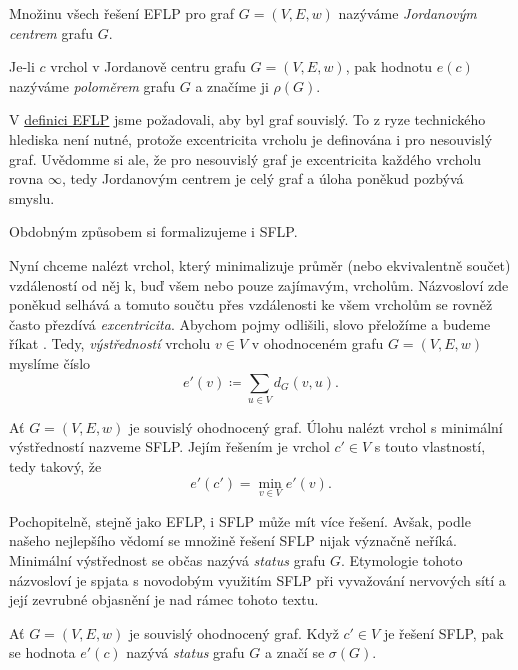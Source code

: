 \begin{definition}
\label{def:jordanovo-centrum}
 Množinu všech řešení EFLP pro graf $G = (V,E,w)$ nazýváme \emph{Jordanovým
 centrem} grafu $G$.
\end{definition}

\begin{definition}
\label{def:polomer-grafu}
 Je-li $c$ vrchol v Jordanově centru grafu $G = (V,E,w)$, pak hodnotu $e(c)$
 nazýváme \emph{poloměrem} grafu $G$ a značíme ji $\rho(G)$.
\end{definition}

\begin{remark}
 V \hyperref[def:eflp]{definici EFLP} jsme požadovali, aby byl graf souvislý.
 To z ryze technického hlediska není nutné, protože excentricita vrcholu je
 definována i pro nesouvislý graf. Uvědomme si ale, že pro nesouvislý graf je
 excentricita každého vrcholu rovna $\infty$, tedy Jordanovým centrem je celý
 graf a úloha poněkud pozbývá smyslu.
\end{remark}

Obdobným způsobem si formalizujeme i SFLP.

Nyní chceme nalézt vrchol, který minimalizuje průměr (nebo ekvivalent\-ně
součet) vzdáleností od něj k, buď všem nebo pouze zajímavým, vrcholům.
Názvosloví zde poněkud selhává a tomuto součtu přes vzdálenosti ke všem vrcholům
se rovněž často přezdívá \emph{excentricita}. Abychom pojmy odlišili, slovo
 přeložíme a budeme říkat . Tedy,
\emph{výstředností} vrcholu $v \in V$ v ohodnoceném grafu $G = (V,E,w)$ myslíme
číslo
\[
 e'(v) \coloneqq \sum_{u \in V} d_G(v,u).
\]

\begin{definition}
 \label{def:sflp}
 Ať $G = (V,E,w)$ je souvislý ohodnocený graf. Úlohu nalézt vrchol s minimální
 výstředností nazveme SFLP. Jejím řešením je vrchol $c' \in V$ s touto
 vlastností, tedy takový, že
 \[
  e'(c') = \min_{v \in V} e'(v).
 \]
\end{definition}

Pochopitelně, stejně jako EFLP, i SFLP může mít více řešení. Avšak, podle našeho
nejlepšího vědomí se množině řešení SFLP nijak význačně neříká. Minimální
výstřednost se občas nazývá \emph{status} grafu $G$. Etymologie tohoto
názvosloví je spjata s novodobým využitím SFLP při vyvažování nervových sítí a
její zevrubné objasnění je nad rámec tohoto textu.

\begin{definition}
 Ať $G = (V,E,w)$ je souvislý ohodnocený graf. Když $c' \in V$ je řešení SFLP,
 pak se hodnota $e'(c)$ nazývá \emph{status} grafu $G$ a značí se $\sigma(G)$.
\end{definition}

